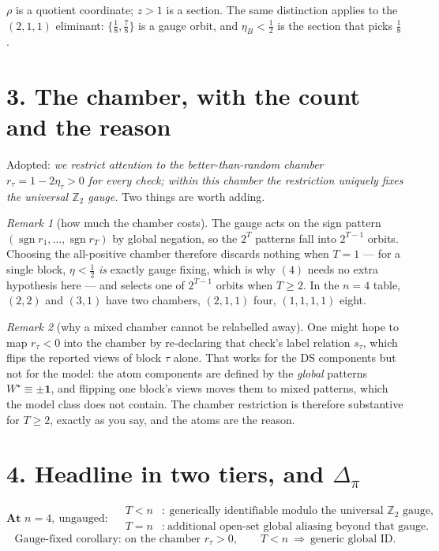 \documentclass[11pt]{article}
\theoremstyle{remark}
\newtheorem*{remark}{Remark}
\newcommand{\Z}{\mathbb{Z}_2}
\newcommand{\one}{\mathbf{1}}
\begin{document}
$\rho$ is a quotient coordinate; $z>1$ is a section. The same distinction applies to the $(2,1,1)$ eliminant: $\{\tfrac18,\tfrac78\}$ is a gauge orbit, and $\eta_B<\tfrac12$ is the section that picks $\tfrac18$.

\section*{3. The chamber, with the count and the reason}

Adopted: \emph{we restrict attention to the better-than-random chamber $r_\tau=1-2\eta_\tau>0$ for every check; within this chamber the restriction uniquely fixes the universal $\Z$ gauge.} Two things are worth adding.

\begin{remark}[how much the chamber costs]
The gauge acts on the sign pattern $(\operatorname{sgn}r_1,\dots,\operatorname{sgn}r_T)$ by global negation, so the $2^T$ patterns fall into $2^{T-1}$ orbits. Choosing the all-positive chamber therefore discards nothing when $T=1$ --- for a single block, $\eta<\tfrac12$ \emph{is} exactly gauge fixing, which is why $(4)$ needs no extra hypothesis here --- and selects one of $2^{T-1}$ orbits when $T\ge2$. In the $n=4$ table, $(2,2)$ and $(3,1)$ have two chambers, $(2,1,1)$ four, $(1,1,1,1)$ eight.
\end{remark}

\begin{remark}[why a mixed chamber cannot be relabelled away]
One might hope to map $r_\tau<0$ into the chamber by re-declaring that check's label relation $s_\tau$, which flips the reported views of block $\tau$ alone. That works for the DS components but not for the model: the atom components are defined by the \emph{global} patterns $W^\star\equiv\pm\one$, and flipping one block's views moves them to mixed patterns, which the model class does not contain. The chamber restriction is therefore substantive for $T\ge2$, exactly as you say, and the atoms are the reason.
\end{remark}

\section*{4. Headline in two tiers, and $\Delta_\pi$}

\[
\boxed{\textbf{At }n=4,\ \text{ungauged}:\quad
\begin{array}{ll}
T<n &:\ \text{generically identifiable modulo the universal }\Z\text{ gauge},\\[1mm]
T=n &:\ \text{additional open-set global aliasing beyond that gauge.}
\end{array}}
\]
\[
\text{Gauge-fixed corollary: on the chamber }r_\tau>0,\qquad T<n\ \Rightarrow\ \text{generic global ID.}
\]
\end{document}
